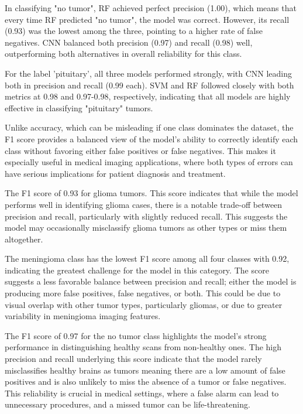 \documentclass[conference]{IEEEtran}
\begin{document}
In classifying "no tumor", RF achieved perfect precision (1.00), which means that every time RF predicted "no tumor", the model was correct. However, its recall (0.93) was the lowest among the three, pointing to a higher rate of false negatives. CNN balanced both precision (0.97) and recall (0.98) well, outperforming both alternatives in overall reliability for this class.

For the label 'pituitary', all three models performed strongly, with CNN leading both in precision and recall (0.99 each). SVM and RF followed closely with both metrics at 0.98 and 0.97-0.98, respectively, indicating that all models are highly effective in classifying "pituitary" tumors.

Unlike accuracy, which can be misleading if one class dominates the dataset, the F1 score provides a balanced view of the model's ability to correctly identify each class without favoring either false positives or false negatives. This makes it especially useful in medical imaging applications, where both types of errors can have serious implications for patient diagnosis and treatment.

The F1 score of 0.93 for glioma tumors. This score indicates that while the model performs well in identifying glioma cases, there is a notable trade-off between precision and recall, particularly with slightly reduced recall. This suggests the model may occasionally misclassify glioma tumors as other types or miss them altogether.

The meningioma class has the lowest F1 score among all four classes with 0.92, indicating the greatest challenge for the model in this category. The score suggests a less favorable balance between precision and recall; either the model is producing more false positives, false negatives, or both. This could be due to visual overlap with other tumor types, particularly gliomas, or due to greater variability in meningioma imaging features. 

The F1 score of 0.97 for the no tumor class highlights the model’s strong performance in distinguishing healthy scans from non-healthy ones. The high precision and recall underlying this score indicate that the model rarely misclassifies healthy brains as tumors meaning there are a low amount of false positives and is also unlikely to miss the absence of a tumor or false negatives. This reliability is crucial in medical settings, where a false alarm can lead to unnecessary procedures, and a missed tumor can be life-threatening.
\end{document}
